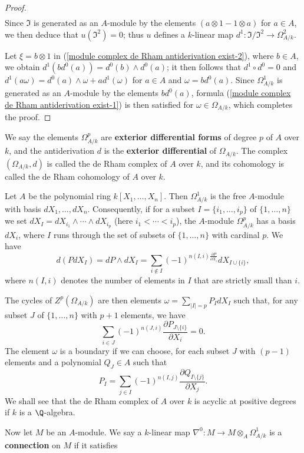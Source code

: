 \begin{proof}
\begin{align}
\end{align}
Since $\mathfrak{I}$ is generated as an $A$-module by the elements $(a\otimes 1-1\otimes a)$ for $a\in A$, we then deduce that $u(\mathfrak{I}^2)=0$; thus $u$ defines a $k$-linear map $d^1:\mathfrak{I}/\mathfrak{I}^2\to\Omega_{A/k}^2$.\par
Let $\xi=b\otimes 1$ in (\ref{module complex de Rham antiderivation exist-2}), where $b\in A$, we obtain $d^1(bd^0(a))=d^0(b)\wedge d^0(a)$; it then follows that $d^1\circ d^0=0$ and $d^1(a\omega)=d^0(a)\wedge\omega+ad^1(\omega)$ for $a\in A$ and $\omega=bd^0(a)$. Since $\Omega_{A/k}^1$ is generated as an $A$-module by the elements $bd^0(a)$, formula (\ref{module complex de Rham antiderivation exist-1}) is then satisfied for $\omega\in\Omega_{A/k}$, which completes the proof.
\end{proof}
We say the elements $\Omega_{A/k}^p$ are \textbf{exterior differential forms} of degree $p$ of $A$ over $k$, and the antiderivation $d$ is the \textbf{exterior differential} of $\Omega_{A/k}$. The complex $(\Omega_{A/k},d)$ is called the de Rham complex of $A$ over $k$, and its cohomology is called the de Rham cohomology of $A$ over $k$.
\begin{example}
Let $A$ be the polynomial ring $k[X_1,\dots,X_n]$. Then $\Omega_{A/k}^1$ is the free $A$-module with basis $dX_1,\dots,dX_n$. Consequently, if for a subset $I=\{i_1,\dots,i_p\}$ of $\{1,\dots,n\}$ we set $dX_I=dX_{i_1}\wedge\cdots\wedge dX_{i_p}$ (here $i_1<\cdots<i_p$), the $A$-module $\Omega_{A/k}^p$ has a basis $dX_i$, where $I$ runs through the set of subsets of $\{1,\dots,n\}$ with cardinal $p$. We have
\[d(PdX_I)=dP\wedge dX_I=\sum_{i\notin I}(-1)^{n(I,i)\frac{\partial P}{\partial X_i}}dX_{I\cup\{i\}},\]
where $n(I,i)$ denotes the number of elements in $I$ that are strictly small than $i$.\par
The cycles of $Z^p(\Omega_{A/k})$ are then elements $\omega=\sum_{|I|=p} P_IdX_I$ such that, for any subset $J$ of $\{1,\dots,n\}$ with $p+1$ elements, we have
\[\sum_{i\in J}(-1)^{n(J,i)}\frac{\partial P_{J\setminus\{i\}}}{\partial X_i}=0.\]
The element $\omega$ is a boundary if we can choose, for each subset $J$ with $(p-1)$ elements and a polynomial $Q_J\in A$ such that
\[P_I=\sum_{j\in I}(-1)^{n(I,j)}\frac{\partial Q_{I\setminus\{j\}}}{\partial X_j}.\]
We shall see that the de Rham complex of $A$ over $k$ is acyclic at positive degrees if $k$ is a $\Q$-algebra.
\end{example}
Now let $M$ be an $A$-module. We say a $k$-linear map $\nabla^0:M\to M\otimes_A\Omega_{A/k}^1$ is a \textbf{connection} on $M$ if it satisfies
